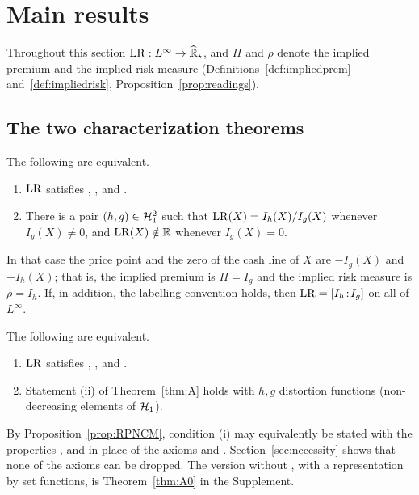 \section{Main results}\label{sec:results}

Throughout this section $\mathrm{LR}:L^\infty\to\widehat{\mathbb R}_\star$, and $\Pi$ and $\rho$ denote the implied
premium and the implied risk measure (Definitions~\ref{def:impliedprem} and~\ref{def:impliedrisk},
Proposition~\ref{prop:readings}).

\subsection{The two characterization theorems}

\begin{theorem}\label{thm:A}
The following are equivalent.
\begin{enumerate}[label=(\roman*),nosep]
\item $\mathrm{LR}$ satisfies \axPe, \axR, \axLI{} and \axRC.
\item There is a pair $(h,g)\in\mathcal H_1^2$ such that $\mathrm{LR}(X)=I_h(X)/I_g(X)$ whenever $I_g(X)\neq0$, and
  $\mathrm{LR}(X)\notin\mathbb R$ whenever $I_g(X)=0$.
\end{enumerate}
In that case the price point and the zero of the cash line of $X$ are $-I_g(X)$ and $-I_h(X)$; that is, the
implied premium is $\Pi=I_g$ and the implied risk measure is $\rho=I_h$. If, in addition,
the labelling convention  holds, then $\mathrm{LR}=[I_h\!:\!I_g]$ on all of $L^\infty$.
\end{theorem}

\begin{theorem}\label{thm:B}
The following are equivalent.
\begin{enumerate}[label=(\roman*),nosep]
\item $\mathrm{LR}$ satisfies \axPe, \axR, \axLI{} and \axRM.
\item Statement (ii) of Theorem~\ref{thm:A} holds with $h,g$ distortion functions (non-decreasing elements
  of $\mathcal H_1$).
\end{enumerate}
\end{theorem}

By Proposition~\ref{prop:RPNCM}, condition (i) may equivalently be stated with the properties \axP, \axN{} and
\axCM{} in place of the axioms \axPe{} and \axR. Section~\ref{sec:necessity} shows that none of the axioms can be
dropped. The version without \axLI, with a representation by set functions, is Theorem~\ref{thm:A0} in the
Supplement.

